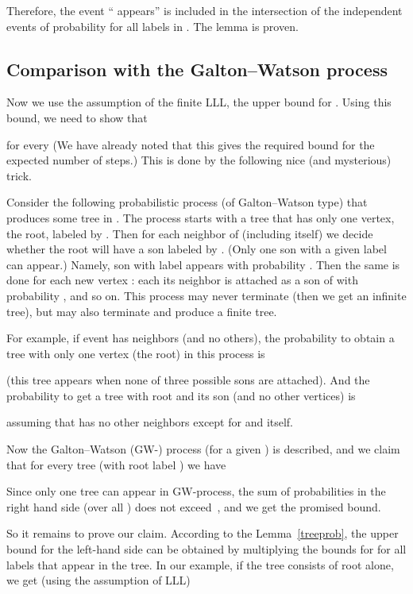 \documentclass[12pt]{article}
\begin{document}
Therefore, the event `` appears'' is included in the intersection of the independent events of probability  for all labels  in . The lemma is proven.

\subsection{Comparison with the Galton--Watson process}

Now we use the assumption of the finite LLL, the upper bound for . Using this bound, we need to show that

for every  (We have already noted that this gives the required bound for the expected number of steps.) This is done by the following nice (and mysterious) trick.

Consider the following probabilistic process  (of Galton--Watson type) that produces some tree in . The process starts with a tree that has only one vertex, the root, labeled by . Then for each neighbor  of  (including  itself) we decide whether the root will have a son labeled by . (Only one son with a given label can appear.) Namely, son with label  appears with probability . Then the same is done for each new vertex : each its neighbor  is attached as a son of  with probability , and so on. This process may never terminate (then we get an infinite tree), but may also terminate and produce a finite tree.

For example, if event  has neighbors  (and no others), the probability to obtain a tree with only one vertex (the root) in this process is
     
(this tree appears when none of three possible sons are attached). And the probability to get a tree with root  and its son  (and no other vertices) is
     
assuming that  has no other neighbors except for  and  itself.

Now the Galton--Watson (GW-) process (for a given ) is described, and we claim that for every tree  (with root label ) we have
    
Since only one tree can appear in GW-process, the sum of probabilities in the right hand side (over all ) does not exceed~, and we get the promised bound.

So it remains to prove our claim. According to the Lemma~\ref{treeprob}, the upper bound for the left-hand side can be obtained by multiplying the bounds for  for all labels  that appear in the tree.  In our example, if the tree consists of root  alone, we get (using the assumption of LLL)
   
\end{document}
